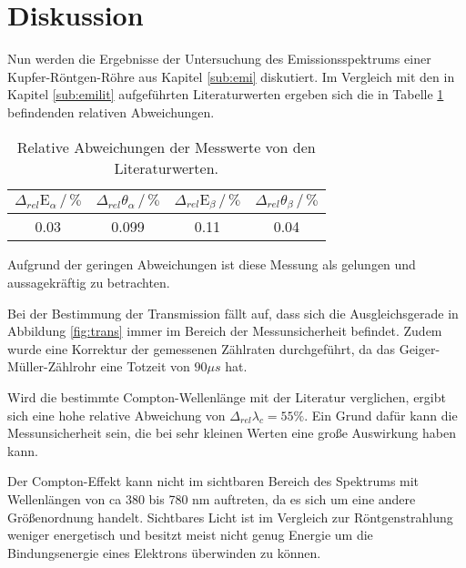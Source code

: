 \newpage
\section{Diskussion}
\label{sec:Diskussion}
\noindent
Nun werden die Ergebnisse der Untersuchung des Emissionsspektrums einer Kupfer-Röntgen-Röhre aus Kapitel \ref{sub:emi} diskutiert.
Im Vergleich mit den in Kapitel \ref{sub:emilit} aufgeführten Literaturwerten ergeben sich die in Tabelle \ref{tab:diskemi} befindenden relativen Abweichungen.

\begin{table}
    \centering
    \caption{Relative Abweichungen der Messwerte von den Literaturwerten.}
    \begin{tabular}{c c c c}
    \toprule
    $\Delta_{rel}\text{E}_\alpha \,/\, \%$ & $\Delta_{rel}\theta_\alpha \,/\, \% $ & $\Delta_{rel}\text{E}_\beta \,/\, \%$ &$\Delta_{rel}\theta_\beta \,/\, \% $\\
    \midrule 
    0.03& 0.099& 0.11& 0.04 \\
    \bottomrule
    \end{tabular}
    \label{tab:diskemi}
    \end{table}

\noindent
Aufgrund der geringen Abweichungen ist diese Messung als gelungen und aussagekräftig zu betrachten.

\noindent
Bei der Bestimmung der Transmission fällt auf, dass sich die Ausgleichsgerade in Abbildung \ref{fig:trans} immer im Bereich der Messunsicherheit befindet.
Zudem wurde eine Korrektur der gemessenen Zählraten durchgeführt, da das Geiger-Müller-Zählrohr eine Totzeit von $90 \mu s $ hat.

\noindent
Wird die bestimmte Compton-Wellenlänge mit der Literatur verglichen, 
ergibt sich eine hohe relative Abweichung von $\Delta_{rel} \lambda_c = 55 \% $.
Ein Grund dafür kann die Messunsicherheit sein, die bei sehr kleinen Werten eine große Auswirkung haben kann.

\noindent
Der Compton-Effekt kann nicht im sichtbaren Bereich des Spektrums mit Wellenlängen von ca 380 bis 780 nm auftreten, da es sich um eine andere Größenordnung handelt.
Sichtbares Licht ist im Vergleich zur Röntgenstrahlung weniger energetisch und besitzt meist nicht genug Energie um die Bindungsenergie eines Elektrons überwinden zu können.